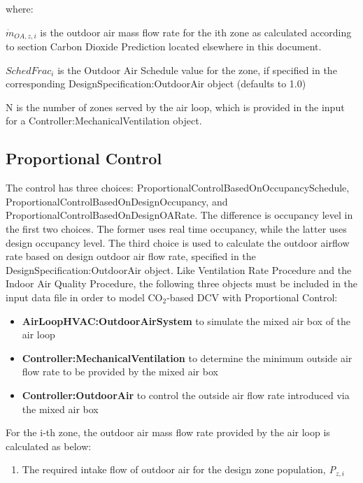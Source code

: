 where:

\({\dot m_{OA,z,i}}\) is the outdoor air mass flow rate for the ith zone as calculated according to section Carbon Dioxide Prediction located elsewhere in this document.

\({SchedFrac_i}\) is the Outdoor Air Schedule value for the zone, if specified in the corresponding DesignSpecification:OutdoorAir object (defaults to 1.0)

N is the number of zones served by the air loop, which is provided in the input for a Controller:MechanicalVentilation object.

\subsection{Proportional Control}\label{proportional-control}

The control has three choices: ProportionalControlBasedOnOccupancySchedule,  ProportionalControlBasedOnDesignOccupancy, and ProportionalControlBasedOnDesignOARate. The difference is occupancy level in the first two choices. The former uses real time occupancy, while the latter uses design occupancy level. The third choice is used to calculate the outdoor airflow rate based on design outdoor air flow rate, specified in the DesignSpecification:OutdoorAir object. Like Ventilation Rate Procedure and the Indoor Air Quality Procedure, the following three objects must be included in the input data file in order to model CO\(_{2}\)-based DCV with Proportional Control:

\begin{itemize}
  \item \textbf{AirLoopHVAC:OutdoorAirSystem} to simulate the mixed air box of the air loop
  \item \textbf{Controller:MechanicalVentilation} to determine the minimum outside air flow rate to be provided by the mixed air box
  \item \textbf{Controller:OutdoorAir} to control the outside air flow rate introduced via the mixed air box
\end{itemize}

For the i-th zone, the outdoor air mass flow rate provided by the air loop is calculated as below:

\begin{enumerate}
\item The required intake flow of outdoor air for the design zone population, \emph{P\(_{z,i}\)}
\end{enumerate}


